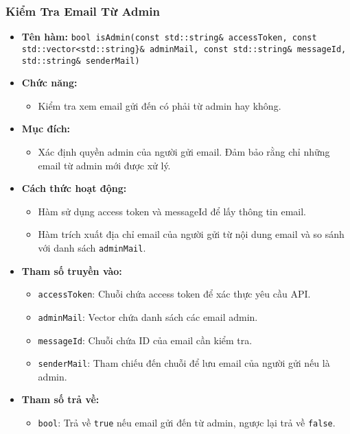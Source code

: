 \subsubsection{Kiểm Tra Email Từ Admin}
\begin{itemize}
    \item \textbf{Tên hàm:} \texttt{bool isAdmin(const std::string\& accessToken, const std::vector<std::string\}\& adminMail, const std::string\& messageId, std::string\& senderMail)}
    \item \textbf{Chức năng:} 
    \begin{itemize}
        \item Kiểm tra xem email gửi đến có phải từ admin hay không.
    \end{itemize}
    \item \textbf{Mục đích:} 
    \begin{itemize}
        \item Xác định quyền admin của người gửi email. Đảm bảo rằng chỉ những email từ admin mới được xử lý.
    \end{itemize}
    \item \textbf{Cách thức hoạt động:} 
    \begin{itemize}
        \item Hàm sử dụng access token và messageId để lấy thông tin email.
        \item Hàm trích xuất địa chỉ email của người gửi từ nội dung email và so sánh với danh sách \texttt{adminMail}.
    \end{itemize}
    \item \textbf{Tham số truyền vào:} 
    \begin{itemize}
        \item \texttt{accessToken}: Chuỗi chứa access token để xác thực yêu cầu API.
        \item \texttt{adminMail}: Vector chứa danh sách các email admin.
        \item \texttt{messageId}: Chuỗi chứa ID của email cần kiểm tra.
        \item \texttt{senderMail}: Tham chiếu đến chuỗi để lưu email của người gửi nếu là admin.
    \end{itemize}
    \item \textbf{Tham số trả về:} 
    \begin{itemize}
        \item \texttt{bool}: Trả về \texttt{true} nếu email gửi đến từ admin, ngược lại trả về \texttt{false}.
    \end{itemize}
\end{itemize}

